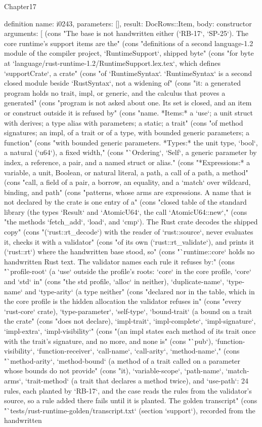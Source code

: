 \begin{lexlean}{Chapter17}
\begin{semanticmodule}
definition{
  name: i0243,
  parameters: [],
  result: DocRows::Item,
  body: constructor{
    arguments: [
      (cons "The base is not handwritten either (`RB-17`, `SP-25`). The core runtime's support items are the" (cons "definitions of a second language-1.2 module of the compiler project, `RuntimeSupport`, shipped byte" (cons "for byte at `language/rust-runtime-1.2/RuntimeSupport.lex.tex`, which defines `supportCrate`, a crate" (cons "of `RuntimeSyntax`. `RuntimeSyntax` is a second closed module beside `RustSyntax`, not a widening of" (cons "it: a generated program holds no trait, impl, or generic, and the calculus that proves a generated" (cons "program is not asked about one. Its set is closed, and an item or construct outside it is refused by" (cons "name. *Items:* a `use`; a unit struct with derives; a type alias with parameters; a static; a trait" (cons "of method signatures; an impl, of a trait or of a type, with bounded generic parameters; a function" (cons "with bounded generic parameters. *Types:* the unit type, `bool`, a natural (`u64`), a fixed width," (cons "`Ordering`, `Self`, a generic parameter by index, a reference, a pair, and a named struct or alias." (cons "*Expressions:* a variable, a unit, Boolean, or natural literal, a path, a call of a path, a method" (cons "call, a field of a pair, a borrow, an equality, and a `match` over wildcard, binding, and path" (cons "patterns, whose arms are expressions. A name that is not declared by the crate is one entry of a" (cons "closed table of the standard library (the types `Result` and `AtomicU64`, the call `AtomicU64::new`," (cons "the methods `fetch_add`, `load`, and `cmp`). The Rust crate decodes the shipped copy" (cons "(`rust::rt_decode`) with the reader of `rust::source`, never evaluates it, checks it with a validator" (cons "of its own (`rust::rt_validate`), and prints it (`rust::rt`) where the handwritten base stood, so" (cons "`runtime::core` holds no handwritten Rust text. The validator names each rule it refuses by:" (cons "`profile-root` (a `use` outside the profile's roots: `core` in the core profile, `core` and `std` in" (cons "the std profile, `alloc` in neither), `duplicate-name`, `type-name` and `type-arity` (a type neither" (cons "declared nor in the table, which in the core profile is the hidden allocation the validator refuses in" (cons "every `rust-core` crate), `type-parameter`, `self-type`, `bound-trait` (a bound on a trait the crate" (cons "does not declare), `impl-trait`, `impl-complete`, `impl-signature`, `impl-extra`, `impl-visibility`" (cons "(an impl states each method of its trait once with the trait's signature, and no more, and none is" (cons "`pub`), `function-visibility`, `function-receiver`, `call-name`, `call-arity`, `method-name`," (cons "`method-arity`, `method-bound` (a method of a trait called on a parameter whose bounds do not provide" (cons "it), `variable-scope`, `path-name`, `match-arms`, `trait-method` (a trait that declares a method twice), and `use-path`: 24 rules, each planted by `RB-17`, and the case reads the rules from the validator's source, so a rule added there fails until it is planted. The golden transcript" (cons "`tests/rust-runtime-golden/transcript.txt` (section `support`), recorded from the handwritten }}
\end{semanticmodule}
\end{lexlean}
